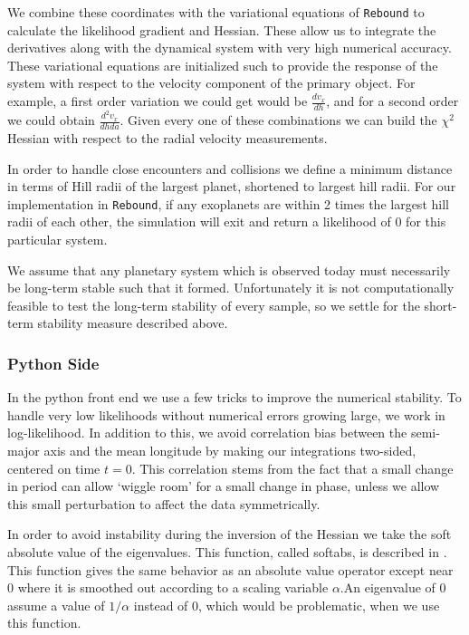 \documentclass{aa}
\begin{document}
We combine these coordinates with the variational equations of \texttt{Rebound} to calculate the likelihood gradient and Hessian. These allow us to integrate the derivatives along with the dynamical system with very high numerical accuracy. These variational equations are initialized such to provide the response of the system with respect to the velocity component of the primary object. For example, a first order variation we could get would be $\frac{dv_x}{dh}$, and for a second order we could obtain $\frac{d^2v_x}{dhda}$. Given every one of these combinations we can build the $\chi^2$ Hessian with respect to the radial velocity measurements.

In order to handle close encounters and collisions we define a minimum distance in terms of Hill radii of the largest planet, shortened to largest hill radii. For our implementation in \texttt{Rebound}, if any exoplanets are within 2 times the largest hill radii of each other, the simulation will exit and return a likelihood of $0$ for this particular system. 

We assume that any planetary system which is observed today must necessarily be long-term stable such that it formed. Unfortunately it is not computationally feasible to test the long-term stability of every sample, so we settle for the short-term stability measure described above.

\subsubsection{Python Side}
In the python front end we use a few tricks to improve the numerical stability. To handle very low likelihoods without numerical errors growing large, we work in log-likelihood. In addition to this, we avoid correlation bias between the semi-major axis and the mean longitude by making our integrations two-sided, centered on time $t=0$. This correlation stems from the fact that a small change in period can allow `wiggle room' for a small change in phase, unless we allow this small perturbation to affect the data symmetrically.

In order to avoid instability during the inversion of the Hessian we take the soft absolute value of the eigenvalues. This function, called softabs, is described in \cite{softabs}. This function gives the same behavior as an absolute value operator except near $0$ where it is smoothed out according to a scaling variable $\alpha$.An eigenvalue of $0$ assume a value of $1/\alpha$ instead of $0$, which would be problematic, when we use this function.
\end{document}
